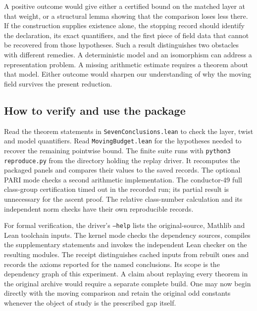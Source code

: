\documentclass[12pt,letterpaper]{article}
\begin{document}
A positive outcome would give either a certified bound on the matched layer at that weight, or a structural lemma showing that the comparison loses less there. If the construction supplies existence alone, the stopping record should identify the declaration, its exact quantifiers, and the first piece of field data that cannot be recovered from those hypotheses. Such a result distinguishes two obstacles with different remedies. A deterministic model and an isomorphism can address a representation problem. A missing arithmetic estimate requires a theorem about that model. Either outcome would sharpen our understanding of why the moving field survives the present reduction.

\subsection{How to verify and use the package}

Read the theorem statements in \texttt{SevenConclusions.lean} to check the layer, twist and model quantifiers. Read \texttt{MovingBudget.lean} for the hypotheses needed to recover the remaining pointwise bound. The finite suite runs with \texttt{python3 reproduce.py} from the directory holding the replay driver. It recomputes the packaged panels and compares their values to the saved records. The optional PARI mode checks a second arithmetic implementation. The conductor-49 full class-group certification timed out in the recorded run; its partial result is unnecessary for the ascent proof. The relative class-number calculation and its independent norm checks have their own reproducible records.

For formal verification, the driver's \texttt{--help} lists the original-source, Mathlib and Lean toolchain inputs. The kernel mode checks the dependency sources, compiles the supplementary statements and invokes the independent Lean checker on the resulting modules. The receipt distinguishes cached inputs from rebuilt ones and records the axioms reported for the named conclusions. Its scope is the dependency graph of this experiment. A claim about replaying every theorem in the original archive would require a separate complete build. One may now begin directly with the moving comparison and retain the original odd constants whenever the object of study is the prescribed gap itself.
\end{document}
